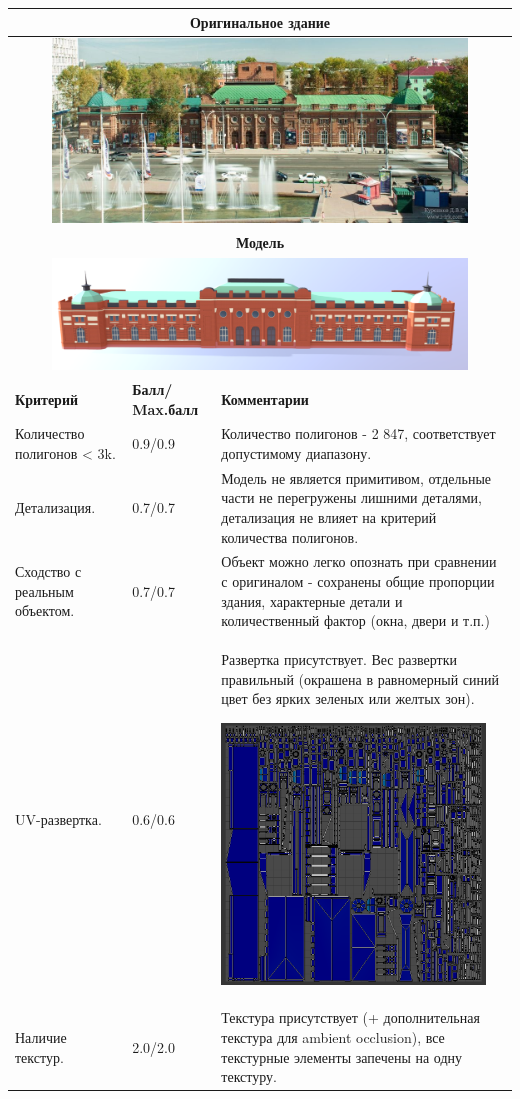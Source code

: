 \begin{longtable}{|p{4cm}|p{2.5cm}|p{7.5cm}|}
    \hline
    \multicolumn{3}{|c|}{\textbf{Оригинальное здание} } \\
    \hline
    \multicolumn{3}{|c|}{\includegraphics[width=11cm]{src/build_6}} \\
    \hline
    \multicolumn{3}{|c|}{\textbf{Модель}} \\
    \hline
    \multicolumn{3}{|c|}{\includegraphics[width=11cm]{src/model_6}} \\
    \hline
    \textbf{Критерий} & \textbf{Балл/ Max.балл} & \textbf{Комментарии} \\
    \hline
    Количество полигонов < 3k. & 0.9/0.9 & Количество полигонов - 2 847, соответствует допустимому диапазону. \\
    \hline
    Детализация. & 0.7/0.7 & Модель не является примитивом, отдельные части не перегружены лишними деталями, детализация не влияет на критерий количества полигонов. \\
    \hline
    Сходство с реальным объектом. & 0.7/0.7 & Объект можно легко опознать при сравнении с оригиналом - сохранены общие пропорции здания, характерные детали и количественный фактор (окна, двери и т.п.) \\
    \hline
    UV-развертка. & 0.6/0.6 & Развертка присутствует. Вес развертки правильный (окрашена в равномерный синий цвет без ярких зеленых или желтых зон).

    \includegraphics[width=7cm]{src/uv_6} \\
    \hline   
    Наличие текстур. & 2.0/2.0 & Текстура присутствует (+ дополнительная текстура для ambient occlusion), все текстурные элементы запечены на одну текстуру.


\end{longtable}
